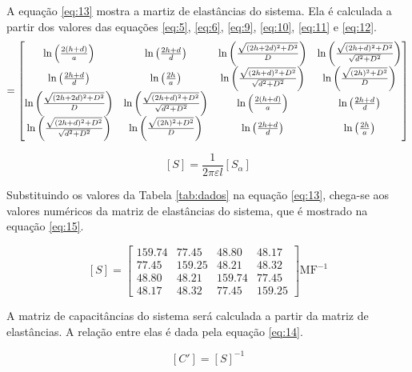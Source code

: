 \documentclass{aleph-revista}
\begin{document}
A equação \eqref{eq:13} mostra a martiz de elastâncias do sistema. Ela é calculada a partir dos valores das equações \eqref{eq:5}, \eqref{eq:6}, \eqref{eq:9}, \eqref{eq:10}, \eqref{eq:11} e \eqref{eq:12}.
\begin{equation*}
  [S_\alpha] =
  \begin{bmatrix}
    \cln{2(h+d)}{a}                           & \cln{2h+d}{d}                             & \cln{\sqrt{(2h+2d)^2+D^2}}{D}             & \cln{\sqrt{(2h+d)^2+D^2}}{\sqrt{d^2+D^2}} \\
    \cln{2h+d}{d}                             & \cln{2h}{a}                               & \cln{\sqrt{(2h+d)^2+D^2}}{\sqrt{d^2+D^2}} & \cln{\sqrt{(2h)^2+D^2}}{D}                \\
    \cln{\sqrt{(2h+2d)^2+D^2}}{D}             & \cln{\sqrt{(2h+d)^2+D^2}}{\sqrt{d^2+D^2}} & \cln{2(h+d)}{a}                           & \cln{2h+d}{d}                             \\
    \cln{\sqrt{(2h+d)^2+D^2}}{\sqrt{d^2+D^2}} & \cln{\sqrt{(2h)^2+D^2}}{D}                & \cln{2h+d}{d}                             & \cln{2h}{a}                               \\
  \end{bmatrix}
\end{equation*}

\begin{equation}\label{eq:13}
  [S] = \frac{1}{2\pi\varepsilon l}[S_\alpha]
\end{equation}

Substituindo os valores da Tabela \ref{tab:dados} na equação \ref{eq:13}, chega-se aos valores numéricos da matriz de elastâncias do sistema, que é mostrado na equação \eqref{eq:15}.

\begin{equation}\label{eq:14-1}
  [S] =
  \begin{bmatrix}
    159.74 & 77.45  & 48.80  & 48.17  \\
    77.45  & 159.25 & 48.21  & 48.32  \\
    48.80  & 48.21  & 159.74 & 77.45  \\
    48.17  & 48.32  & 77.45  & 159.25
  \end{bmatrix}
  \textrm{MF}^{-1}
\end{equation}

A matriz de capacitâncias do sistema será calculada a partir da matriz de elastâncias. A relação entre elas é dada pela equação \eqref{eq:14}.

\begin{equation}\label{eq:14}
  [C'] = [S]^{-1}
\end{equation}
\end{document}
